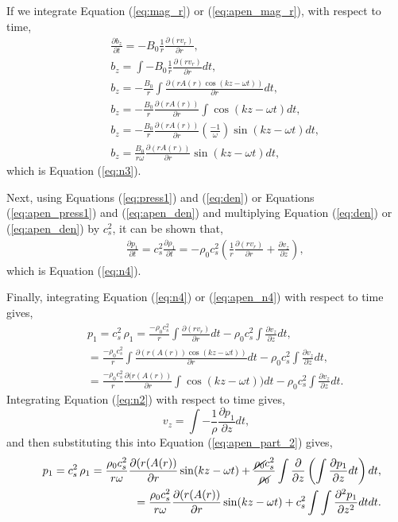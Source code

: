 If we integrate Equation (\ref{eq:mag_r}) or (\ref{eq:apen_mag_r}), with respect to time,
\begin{align}
&&\frac{\partial b_z}{\partial t}=-B_0\frac{1}{r}\frac{\partial (rv_r)}{\partial r},\\
&& b_z = \int -B_0\frac{1}{r}\frac{\partial (rv_r)}{\partial r} dt,\\
&& b_z =  -\frac{B_0}{r}\int\frac{\partial (rA(r)\cos(kz-\omega t))}{\partial r} dt,\\
&& b_z =  -\frac{B_0}{r}\frac{\partial (rA(r))}{\partial r}\int \cos(kz-\omega t) dt,\\
&& b_z =  -\frac{B_0}{r}\frac{\partial (rA(r))}{\partial r}\left(\frac{-1}{\omega}\right) \sin(kz-\omega t) dt,\\
&& b_z =  \frac{B_0}{r\omega}\frac{\partial (rA(r))}{\partial r}\sin(kz-\omega t) dt,
\end{align}
which is Equation (\ref{eq:n3}).

Next, using Equations (\ref{eq:press1}) and (\ref{eq:den}) or Equations (\ref{eq:apen_press1}) and (\ref{eq:apen_den}) and multiplying Equation (\ref{eq:den}) or (\ref{eq:apen_den}) by $c_s^2$, it can be shown that,
\begin{align}
&&\frac{\partial p_1}{\partial t}=c_s^2\frac{\partial\rho_1}{\partial t}=-\rho_0 c_s^2\left(\frac{1}{r}\frac{\partial(rv_r)}{\partial r}+\frac{\partial v_z}{\partial z}\right)\label{eq:apen_n4},
\end{align}
which is Equation (\ref{eq:n4}).

Finally, integrating Equation (\ref{eq:n4}) or (\ref{eq:apen_n4}) with respect to time gives,
\begin{align}
&& p_1 =c_s^2\,\rho_1 = \frac{-\rho_0 c_s^2}{r} \int \frac{\partial(rv_r)}{\partial r} dt - \rho_0 c_s^2 \int \frac{\partial v_z}{\partial z} dt, \\
&& =\frac{-\rho_0 c_s^2}{r} \int \frac{\partial(r(A(r))\cos(kz-\omega t))}{\partial r} dt - \rho_0 c_s^2 \int \frac{\partial v_z}{\partial z} dt, \\
&& =\frac{-\rho_0 c_s^2}{r} \frac{\partial(r(A(r))}{\partial r} \int \cos(kz-\omega t)) dt - \rho_0 c_s^2 \int \frac{\partial v_z}{\partial z} dt.\label{eq:apen_part_2}
\end{align}
Integrating Equation (\ref{eq:n2}) with respect to time gives, $$v_z = \int -\frac{1}{\rho} \frac{\partial p_1}{\partial z} dt,$$ and then substituting this into Equation (\ref{eq:apen_part_2}) gives,
\begin{align}
&& p_1 = c_s^2\,\rho_1 =\frac{\rho_0 c_s^2}{r\omega}\frac{\partial(r(A(r))}{\partial r} \sin(kz-\omega t) + \frac{\cancel{\rho_0} c_s^2}{\cancel{\rho_0}} \int \frac{\partial}{\partial z} \left(\int \frac{\partial p_1}{\partial z} dt \right) dt,\\
&& = \frac{\rho_0 c_s^2}{r\omega}\frac{\partial(r(A(r))}{\partial r} \sin(kz-\omega t)  + c_s^2 \int\int \frac{\partial^2 p_1}{\partial z^2} dt dt.\label{eq:apen_wow}
\end{align}

